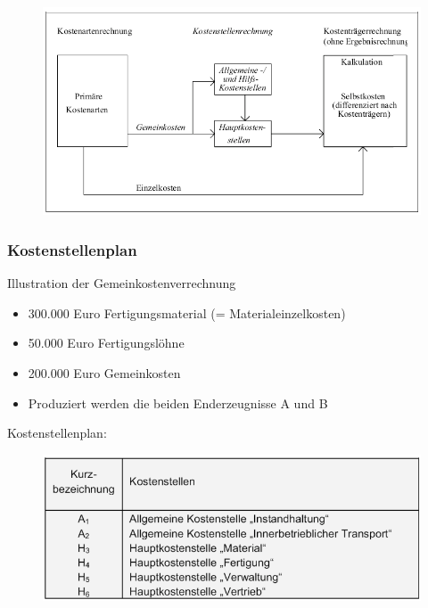 \documentclass[a4paper,11pt, twoside]{article}
\begin{document}
\begin{figure}[h]
 \begin{center}
   \includegraphics[scale=0.5]{bilder/kostenstellenrechnung_ueberblick.png}
 \end{center}
\end{figure}

\subsubsection*{Kostenstellenplan}

Illustration der Gemeinkostenverrechnung
\begin{itemize}
	\item 300.000 Euro Fertigungsmaterial (= Materialeinzelkosten)
	\item 50.000 Euro Fertigungslöhne
	\item 200.000 Euro Gemeinkosten
	\item Produziert werden die beiden Enderzeugnisse A und B
\end{itemize} 

\newpage
Kostenstellenplan:

\begin{figure}[h]
 \begin{center}
   \includegraphics[scale=0.5]{bilder/kostenstellenplan.png}
 \end{center}
\end{figure}
\end{document}

